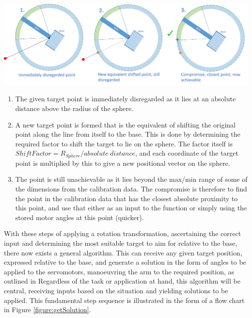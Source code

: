 \documentclass[11pt]{article}
\begin{document}
\begin{center}
\includegraphics[width=\textwidth]{images/gestureSolution2.png}
\label{figure:gestureSolution}
\end{center}


\begin{enumerate}
\item{The given target point is immediately disregarded as it lies at an absolute distance above the radius of the sphere.}
\item{A new target point is formed that is the equivalent of shifting the original point along the line from itself to the base. This is done by determining the required factor to shift the target to lie on the sphere. The factor itself is $Shift Factor = R_{Sphere} / absolute \ distance$, and each coordinate of the target point is multiplied by this to give a new positional vector on the sphere.}
\item{The point is still unachievable as it lies beyond the max/min range of some of the dimensions from the calibration data. The compromise is therefore to find the point in the calibration data that has the closest absolute proximity to this point, and use that either as an input to the function or simply using the stored motor angles at this point (quicker).}
\end{enumerate}


With these steps of applying a rotation transformation, ascertaining the correct input and determining the most suitable target to aim for relative to the base, there now exists a general algorithm. This can receive any given target position, expressed relative to the base, and generate a solution in the form of angles to be applied to the servomotors, manoeuvring the arm to the required position, as outlined in  Regardless of the task or application at hand, this algorithm will be central, receiving inputs based on the situation and yielding solutions to be applied. This fundamental step sequence is illustrated in the form of a flow chart in Figure \ref{figure:getSolution}.
\end{document}
